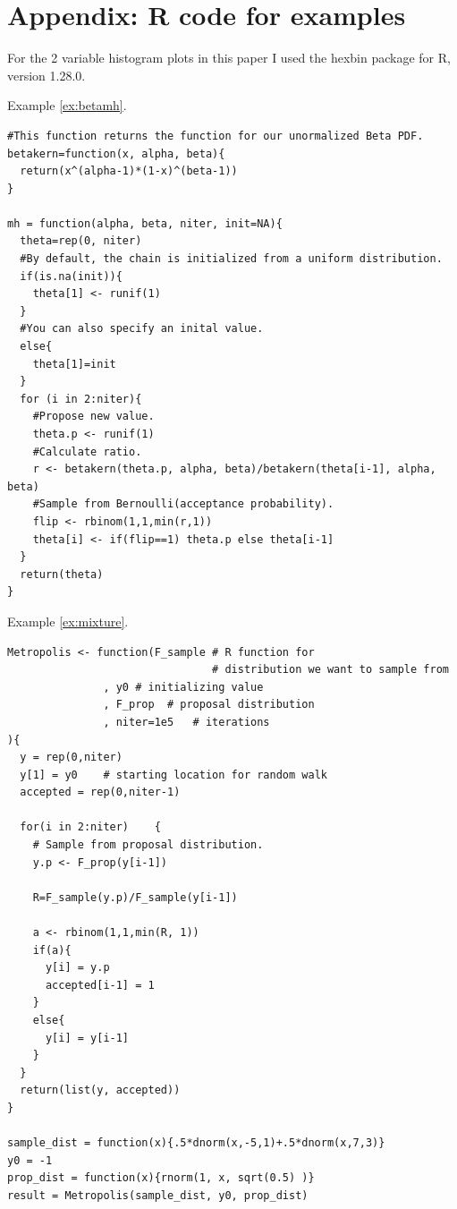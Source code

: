 \documentclass[11pt]{amsart}
\theoremstyle{theorem} %
\theoremstyle{definition}                  %
\theoremstyle{example}                       %
\theoremstyle{remark}                       %
\numberwithin{equation}{section}
\begin{document}
\newpage

\section{Appendix: R code for examples}

For the 2 variable histogram plots in this paper I used the hexbin package for R, version 1.28.0.

\medskip

Example \ref{ex:betamh}.\begin{verbatim}
#This function returns the function for our unormalized Beta PDF.
betakern=function(x, alpha, beta){
  return(x^(alpha-1)*(1-x)^(beta-1))
}

mh = function(alpha, beta, niter, init=NA){
  theta=rep(0, niter)
  #By default, the chain is initialized from a uniform distribution.
  if(is.na(init)){
    theta[1] <- runif(1)
  }
  #You can also specify an inital value.
  else{
    theta[1]=init
  }
  for (i in 2:niter){
    #Propose new value.
    theta.p <- runif(1)
    #Calculate ratio.
    r <- betakern(theta.p, alpha, beta)/betakern(theta[i-1], alpha, beta)
    #Sample from Bernoulli(acceptance probability).
    flip <- rbinom(1,1,min(r,1))
    theta[i] <- if(flip==1) theta.p else theta[i-1]
  }
  return(theta)
}
    \end{verbatim}
    
Example \ref{ex:mixture}. \begin{verbatim}
Metropolis <- function(F_sample # R function for 
                                # distribution we want to sample from
               , y0 # initializing value
               , F_prop  # proposal distribution
               , niter=1e5   # iterations
){
  y = rep(0,niter)
  y[1] = y0    # starting location for random walk
  accepted = rep(0,niter-1)
  
  for(i in 2:niter)    {
    # Sample from proposal distribution.
    y.p <- F_prop(y[i-1])

    R=F_sample(y.p)/F_sample(y[i-1])
    
    a <- rbinom(1,1,min(R, 1))
    if(a){
      y[i] = y.p
      accepted[i-1] = 1
    }    
    else{
      y[i] = y[i-1]
    }    
  }
  return(list(y, accepted))
}

sample_dist = function(x){.5*dnorm(x,-5,1)+.5*dnorm(x,7,3)}
y0 = -1
prop_dist = function(x){rnorm(1, x, sqrt(0.5) )}
result = Metropolis(sample_dist, y0, prop_dist)
    \end{verbatim}
    
\end{document}
